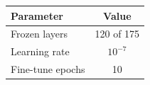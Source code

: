 \begin{tabular}{lc}
\toprule
Parameter & Value \\
\midrule
Frozen layers & 120 of 175 \\
Learning rate & $10^{-7}$ \\
Fine-tune epochs & 10 \\
\bottomrule
\end{tabular}

